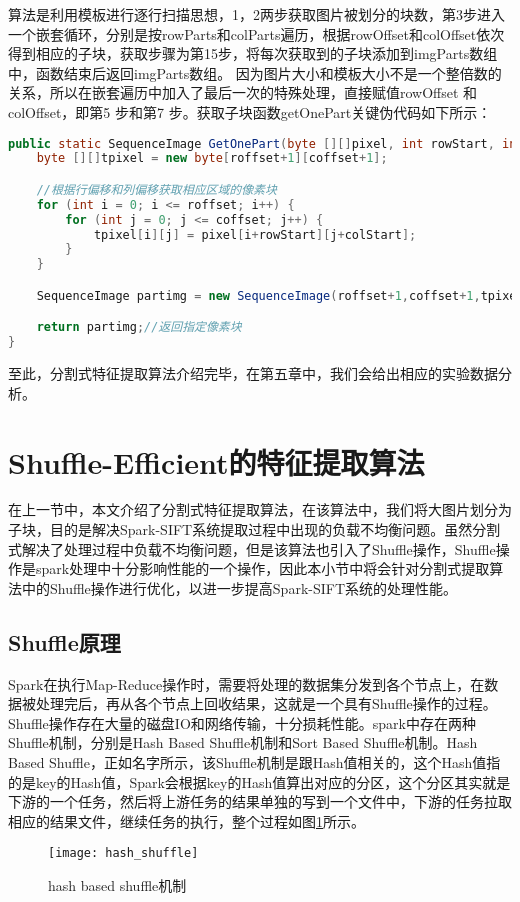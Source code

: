 算法是利用模板进行逐行扫描思想，1，2两步获取图片被划分的块数，第3步进入一个嵌套循环，分别是按rowParts和colParts遍历，根据rowOffset和colOffset依次得到相应的子块，获取步骤为第15步，将每次获取到的子块添加到imgParts数组中，函数结束后返回imgParts数组。 因为图片大小和模板大小不是一个整倍数的关系，所以在嵌套遍历中加入了最后一次的特殊处理，直接赋值rowOffset 和colOffset，即第5 步和第7 步。获取子块函数getOnePart关键伪代码如下所示：
\begin{lstlisting}[language=Java]
public static SequenceImage GetOnePart(byte [][]pixel, int rowStart, int colStart, int roffset, int coffset){
    byte [][]tpixel = new byte[roffset+1][coffset+1];

    //根据行偏移和列偏移获取相应区域的像素块
    for (int i = 0; i <= roffset; i++) {
        for (int j = 0; j <= coffset; j++) {
            tpixel[i][j] = pixel[i+rowStart][j+colStart];
        }
    }

    SequenceImage partimg = new SequenceImage(roffset+1,coffset+1,tpixel);

    return partimg;//返回指定像素块
}
\end{lstlisting}

至此，分割式特征提取算法介绍完毕，在第五章中，我们会给出相应的实验数据分析。
\section{Shuffle-Efficient的特征提取算法}
在上一节中，本文介绍了分割式特征提取算法，在该算法中，我们将大图片划分为子块，目的是解决Spark-SIFT系统提取过程中出现的负载不均衡问题。虽然分割式解决了处理过程中负载不均衡问题，但是该算法也引入了Shuffle操作，Shuffle操作是spark处理中十分影响性能的一个操作，因此本小节中将会针对分割式提取算法中的Shuffle操作进行优化，以进一步提高Spark-SIFT系统的处理性能。
\subsection{Shuffle原理}
Spark在执行Map-Reduce操作时，需要将处理的数据集分发到各个节点上，在数据被处理完后，再从各个节点上回收结果，这就是一个具有Shuffle操作的过程。Shuffle操作存在大量的磁盘IO和网络传输，十分损耗性能。spark中存在两种Shuffle机制，分别是Hash Based Shuffle机制和Sort Based Shuffle机制。Hash Based Shuffle，正如名字所示，该Shuffle机制是跟Hash值相关的，这个Hash值指的是key的Hash值，Spark会根据key的Hash值算出对应的分区，这个分区其实就是下游的一个任务，然后将上游任务的结果单独的写到一个文件中，下游的任务拉取相应的结果文件，继续任务的执行，整个过程如图\ref{fig:hash_shuffle}所示。
\begin{figure}[htp]
\centering
\texttt{[image: hash\_shuffle]}
\caption{hash based shuffle机制}
\label{fig:hash_shuffle}
\end{figure}

